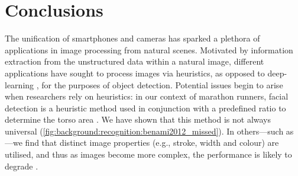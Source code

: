 \chapter{Conclusions}
\label{ch:conclusion}

The unification of smartphones and cameras has sparked a plethora of applications in image processing from natural scenes. Motivated by information extraction from the unstructured data within a natural image, different applications have sought to process images via heuristics, as opposed to deep-learning , for the purposes of object detection. Potential issues begin to arise when researchers rely on heuristics: in our context of marathon runners, facial detection is a heuristic method used in conjunction with a predefined ratio to determine the torso area \citep{Benami:2012jf}. We have shown that this method is not always universal (\cref{fig:background:recognition:benami2012_missed}). In others---such as ---we find that distinct image properties (e.g., stroke, width and colour) are utilised, and thus as images become more complex, the performance is likely to degrade \citep{Li:2012wd}.





